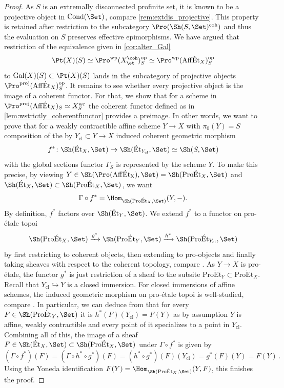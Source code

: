 \documentclass[leqno]{article}
\renewcommand{\Gal}{\mathrm{Gal}}
\DeclareMathOperator{\Cond}{Cond}
\newcommand{\CondSet}{\Cond(\Set)}
\newcommand{\Et}[1]{\mathrm{\acute{E}t}_{#1}}
\newcommand{\ProEt}[1]{\mathrm{Pro\acute{E}t}_{#1}}
\begin{document}
\begin{proof}
%
As $S$ is an extremally disconnected profinite set, it is known to be a projective object in $\CondSet$, compare \cref{rem:extdis_projective}.
This property is retained after restriction to the subcategory $\Pro(\Sh(S,\Set)^{\mathrm{coh}})$ and thus the evaluation on $S$ preserves effective epimorphisms.
We have argued that restriction of the equivalence given in \cref{cor:alter_Gal} $$\Pt(X)(S)\simeq \Pro^{\mathrm{wp}}(X_{\et}^{\coh})_S^{\mathrm{op}}\simeq \Pro^{\mathrm{wp}}(\mathrm{Aff}\Et{X})_S^{\mathrm{op}}$$ to $\Gal(X)(S)\subset \Pt(X)(S)$ lands in the subcategory of projective objects $\Pro^{\mathrm{proj}}(\mathrm{Aff}\Et{X})_S^{\mathrm{op}}$.
It remains to see whether every projective object is the image of a coherent functor.
For that, we show that for a scheme in $\Pro^{\mathrm{proj}}(\mathrm{Aff}\Et{X})_S\simeq {X_{S}^{\mathrm{wc}}}$ the coherent functor defined as in \cref{lem:wstrictly_coherentfunctor} provides a preimage.
In other words, we want to prove that for a weakly contractible affine scheme $Y\rightarrow X$ with $\pi_0(Y)=S$ composition of the by $Y_{\mathrm{cl}}\subset Y \rightarrow X$ induced coherent geometric morphism 
$$f^*\colon \Sh(\Et{X}, \Set) \rightarrow \Sh(\Et{Y_{\mathrm{cl}}}, \Set)\simeq \Sh(S,\Set)$$ with the global sections functor $\Gamma_S$ is represented by the scheme $Y$.
To make this precise, by viewing $Y\in \Sh(\Pro(\mathrm{Aff\Et{X}}),\Set)=\Sh(\ProEt{X}, \Set) $ and $\Sh(\Et{X}, \Set)\subset \Sh(\ProEt{X}, \Set)$, we want $$\Gamma \circ f^*=\Hom_{\Sh(\ProEt{X}, \Set)}(Y,-).$$
By definition, $f^*$ factors over $\Sh(\Et{Y}, \Set)$. We extend $f^*$ to a functor on pro-\'etale topoi
$$\Sh(\ProEt{X}, \Set) \xrightarrow{g^*} \Sh(\ProEt{Y}, \Set) \xrightarrow{h^*} \Sh(\ProEt{Y_{\mathrm{cl}}}, \Set)$$ by first restricting to coherent objects, then extending to pro-objects and finally taking sheaves with respect to the coherent topology, compare \cite[Example 7.1.7]{Ultracategories}.
As $Y\rightarrow X$ is pro-\'etale, the functor $g^*$ is just restriction of a sheaf to the subsite $\ProEt{Y}\subset \ProEt{X}$. Recall that $Y_{\mathrm{cl}}\hookrightarrow Y$ is a closed immersion. For closed immersions of affine schemes, the induced geometric morphism on pro-\'etale topoi is well-studied, compare .
In particular, we can deduce from  that for every $F\in \Sh(\ProEt{Y}, \Set)$ it is $h^*(F)(Y_{\mathrm{cl}})=F(Y)$ as by assumption $Y$ is affine, weakly contractible and every point of it specializes to a point in $Y_{\mathrm{cl}}$.
Combining all of this, the image of a sheaf $F \in \Sh(\Et{X}, \Set)\subset \Sh(\ProEt{X}, \Set)$ under $\Gamma \circ f^*$ is given by $$(\Gamma \circ f^*)(F)=(\Gamma \circ h^* \circ g^*)(F)=(h^*\circ g^*)(F)(Y_{\mathrm{cl}})=g^*(F)(Y)=F(Y)\period$$ Using the Yoneda identification $F(Y)=\Hom_{\Sh(\ProEt{X}, \Set)}(Y,F)$, this finishes the proof.
\end{proof}
\end{document}
